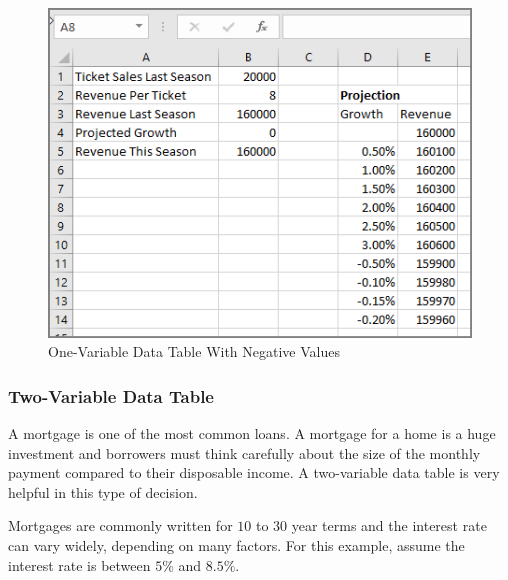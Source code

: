 \begin{figure}[H]
	\centering
	\includegraphics[width=\maxwidth{.95\linewidth}]{gfx/ch08_fig20}
	\caption{One-Variable Data Table With Negative Values}
	\label{08:fig20}
\end{figure}

\subsubsection{Two-Variable Data Table}

A mortgage is one of the most common loans. A mortgage for a home is a huge investment and borrowers must think carefully about the size of the monthly payment compared to their disposable income. A two-variable data table is very helpful in this type of decision.

Mortgages are commonly written for $ 10 $ to $ 30 $ year terms and the interest rate can vary widely, depending on many factors. For this example, assume the interest rate is between $ 5\% $ and $ 8.5\% $.

